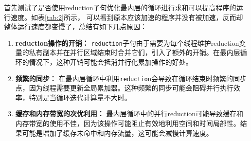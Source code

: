\documentclass{article}
\begin{document}
首先测试了是否使用reduction子句优化最内层的循环进行求和可以提高程序的运行速度。如表\ref{tab:2}所示，
可以看到原本应该加速的程序并没有被加速，反而却整体运行速度都变慢了，总结有如下几点原因：
\begin{enumerate}
    \item \textbf{reduction操作的开销：} \texttt{reduction}子句由于需要为每个线程维护reduction变量的私有副本并在并行区域结束时合并它们，引入了额外的开销。在最内层循环的情况下，这种开销可能会抵消并行化累加操作的好处。
    \item \textbf{频繁的同步：} 在最内层循环中利用\texttt{reduction}会导致在循环结束时频繁的同步点，因为线程需要更新全局累加器。这种频繁的同步可能会阻碍并行执行效率，特别是当循环迭代计算量不大时。
    \item \textbf{缓存和内存带宽的次优利用：} 最内层循环中的并行reduction可能导致缓存和内存带宽的使用不佳，因为该操作可能阻止有效地利用空间和时间局部性。结果可能是增加了缓存未命中和内存流量，这可能会减慢计算速度。
\end{enumerate}
\end{document}
